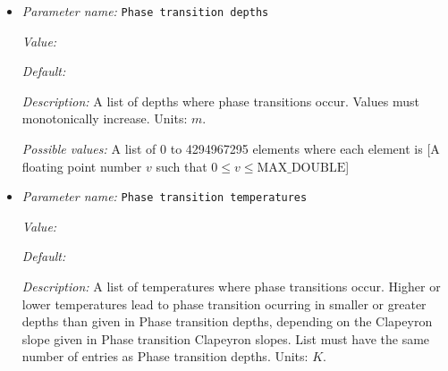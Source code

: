 \begin{itemize}
{\it Value:} 


{\it Default:} 


{\it Description:} A list of Clapeyron slopes for each phase transition. A positive Clapeyron slope indicates that the phase transition will occur in a greater depth, if the temperature is higher than the one given in Phase transition temperatures and in a smaller depth, if the temperature is smaller than the one given in Phase transition temperatures. For negative slopes the other way round. List must have the same number of entries as Phase transition depths. Units: $Pa/K$.


{\it Possible values:} A list of 0 to 4294967295 elements where each element is [A floating point number $v$ such that $-\text{MAX\_DOUBLE} \leq v \leq \text{MAX\_DOUBLE}$]
\item {\it Parameter name:} {\tt Phase transition depths}
\label{parameters:Material model/Grain size model/Phase transition depths}


{\it Value:} 


{\it Default:} 


{\it Description:} A list of depths where phase transitions occur. Values must monotonically increase. Units: $m$.


{\it Possible values:} A list of 0 to 4294967295 elements where each element is [A floating point number $v$ such that $0 \leq v \leq \text{MAX\_DOUBLE}$]
\item {\it Parameter name:} {\tt Phase transition temperatures}
\label{parameters:Material model/Grain size model/Phase transition temperatures}


{\it Value:} 


{\it Default:} 


{\it Description:} A list of temperatures where phase transitions occur. Higher or lower temperatures lead to phase transition ocurring in smaller or greater depths than given in Phase transition depths, depending on the Clapeyron slope given in Phase transition Clapeyron slopes. List must have the same number of entries as Phase transition depths. Units: $K$.



\end{itemize}

